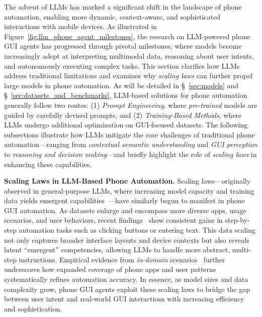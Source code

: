The advent of LLMs has marked a significant shift in the landscape of phone automation, enabling more dynamic, context-aware, and sophisticated interactions with mobile devices. As illustrated in Figure~\ref{fig:llm_phone_agent_milestones}, the research on LLM-powered phone GUI agents has progressed through pivotal milestones, where models become increasingly adept at interpreting multimodal data, reasoning about user intents, and autonomously executing complex tasks. This section clarifies how LLMs address traditional limitations and examines why \emph{scaling laws} can further propel large models in phone automation.
As will be detailed in \S\ \ref{sec:models} and \S\ \ref{sec:datasets_and_benchmarks}, LLM-based solutions for phone automation generally follow two routes: (1) \emph{Prompt Engineering}, where \emph{pre-trained} models are guided by carefully devised prompts, and (2) \emph{Training-Based Methods}, where LLMs undergo additional optimization on GUI-focused datasets. The following subsections illustrate how LLMs mitigate the core challenges of traditional phone automation—ranging from \emph{contextual semantic understanding} and \emph{GUI perception} to \emph{reasoning and decision making}—and briefly highlight the role of \emph{scaling laws} in enhancing these capabilities.



\noindent\textbf{Scaling Laws in LLM-Based Phone Automation.}
Scaling laws—originally observed in general-purpose LLMs, where increasing model capacity and training data yields emergent capabilities~\cite{brown2020language,kaplan2020scaling,hagendorff2023machine}—have similarly begun to manifest in phone GUI automation. As datasets enlarge and encompass more diverse apps, usage scenarios, and user behaviors, recent findings~\cite{cheng2024seeclick,chen2024guicourse,lu2024guiodyssey,pawlowski2024tinyclick} show consistent gains in step-by-step automation tasks such as clicking buttons or entering text. This data scaling not only captures broader interface layouts and device contexts but also reveals latent “emergent” competencies, allowing LLMs to handle more abstract, multi-step instructions. Empirical evidence from \emph{in-domain} scenarios~\cite{li2024androidcontrol} further underscores how expanded coverage of phone apps and user patterns systematically refines automation accuracy. In essence, as model sizes and data complexity grow, phone GUI agents exploit these scaling laws to bridge the gap between user intent and real-world GUI interactions with increasing efficiency and sophistication.


